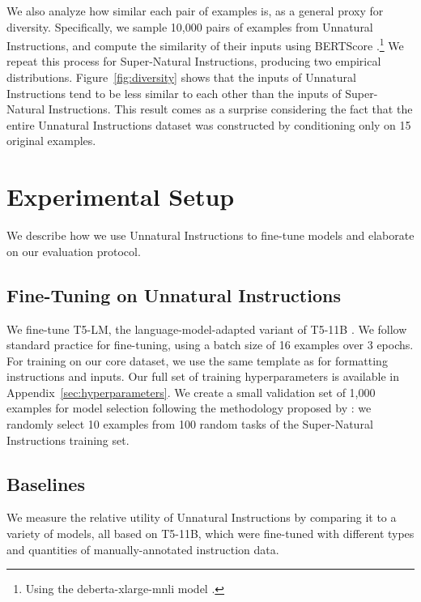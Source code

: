 We also analyze how similar each pair of examples is, as a general proxy for diversity. Specifically, we sample 10,000 pairs of examples from Unnatural Instructions, and compute the similarity of their inputs using BERTScore \cite{bertscore}.\footnote{Using the deberta-xlarge-mnli model \cite{he2021deberta}.} We repeat this process for Super-Natural Instructions, producing two empirical distributions.
Figure~\ref{fig:diversity} shows that the inputs of Unnatural Instructions tend to be less similar to each other than the inputs of Super-Natural Instructions. This result comes as a surprise considering the fact that the entire Unnatural Instructions dataset was constructed by conditioning only on 15 original examples.

\section{Experimental Setup}
\label{sec:setup}

We describe how we use Unnatural Instructions to fine-tune models and elaborate on our evaluation protocol.

\subsection{Fine-Tuning on Unnatural Instructions}

We fine-tune T5-LM, the language-model-adapted variant of T5-11B \citep{2020t5, lester-etal-2021-power}. We follow standard practice for fine-tuning, using a batch size of 16 examples over 3 epochs. For training on our core dataset, we use the same template as \citet{supernaturalinstructions} for formatting instructions and inputs. Our full set of training hyperparameters is available in Appendix~\ref{sec:hyperparameters}.
We create a small validation set of 1,000 examples for model selection following the methodology proposed by \citet{supernaturalinstructions}: we randomly select 10 examples from 100 random tasks of the Super-Natural Instructions training set.

\subsection{Baselines}

We measure the relative utility of Unnatural Instructions by comparing it to a variety of models, all based on T5-11B, which were fine-tuned with different types and quantities of manually-annotated instruction data.

